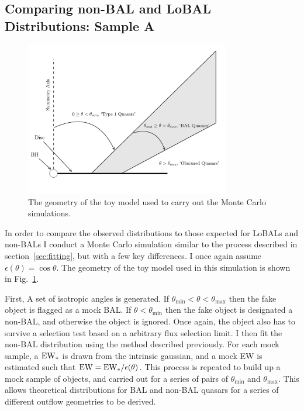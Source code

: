 \subsection{Comparing non-BAL and LoBAL Distributions: Sample A}
\label{sec:bal_v_nonbal}

\begin{figure}
\centering
\includegraphics[width=0.8\textwidth]{figures/ewpaper/fig2_cartoon.png}
\caption
{
The geometry of the toy model used to carry out the Monte Carlo simulations.
}
\label{fig:cartoon}
\end{figure}

In order to compare the observed distributions to those expected for LoBALs and
non-BALs I conduct a Monte Carlo simulation similar to
the process described in section~\ref{sec:fitting}, but with a few 
key differences. I once again assume $\epsilon(\theta) = \cos \theta$.
The geometry of the toy model used in this simulation is shown in
Fig.~\ref{fig:cartoon}.

First, A set of isotropic angles is generated.
If $\theta_{\mathrm{min}}<\theta<\theta_{\mathrm{max}}$ then the fake object 
is flagged as a mock BAL. If $\theta<\theta_{\mathrm{min}}$ then the 
fake object is designated a non-BAL, and otherwise
the object is ignored. Once again, the object also has to 
survive a selection test based on a arbitrary flux selection limit.
I then fit the non-BAL distribution using the method described previously.
For each mock sample, a ${\rm EW}_*$ is drawn from the intrinsic gaussian,
and a mock EW is estimated such that ${\rm EW} = {\rm EW}_* / \epsilon(\theta)$.
This process is repeated to build up a mock sample of objects, and 
carried out for a series of pairs of $\theta_{\mathrm{min}}$ and $\theta_{\mathrm{max}}$.
This allows theoretical distributions for BAL and non-BAL quasars
for a series of different outflow geometries to be derived.

